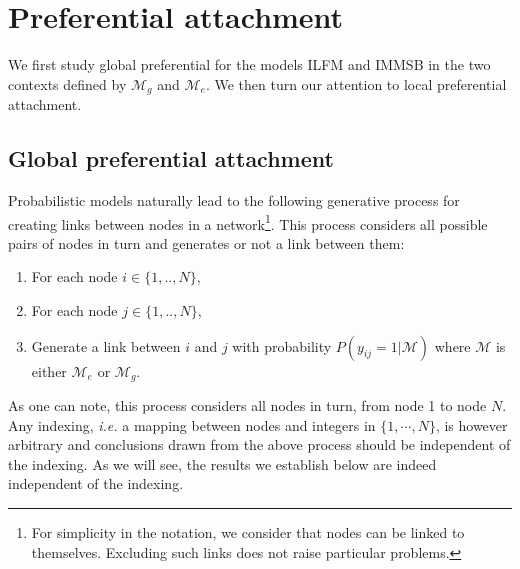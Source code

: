 \section{Preferential attachment}
\label{sec:burstiness}

We first study global preferential for the models ILFM and IMMSB in the two contexts defined by $\mathcal{M}_g$ and $\mathcal{M}_e$. We then turn our attention to local preferential attachment.

\subsection{Global preferential attachment}

Probabilistic models naturally lead to the following generative process for creating links between nodes in a network\footnote{For simplicity in the notation, we consider that nodes can be linked to themselves. Excluding such links does not raise particular problems.}. This process considers all possible pairs of nodes in turn and generates or not a link between them:

\begin{enumerate}
 \item For each node $i \in \{1, .., N\}$,
 \item For each node $j \in \{1, .., N\}$,
 \item Generate a link between $i$ and $j$ with probability $P(y_{ij}=1 | \mathcal{M})$ where $\mathcal{M}$ is either $\mathcal{M}_e$ or $\mathcal{M}_g$.
\end{enumerate}

As one can note, this process considers all nodes in turn, from node 1 to node $N$. Any indexing, \textit{i.e.} a mapping between nodes and integers in $\{1,\cdots,N\}$, is however arbitrary and conclusions drawn from the above process should be independent of the indexing. As we will see, the results we establish below are indeed independent of the indexing.


